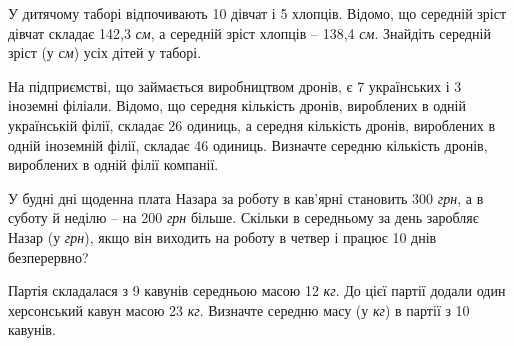 \documentclass[12pt]{article}
\begin{document}
\begin{samepage}
\noindent\zadnum У дитячому таборі відпочивають 10 дівчат і 5 хлопців. Відомо, що середній зріст дівчат складає 142{,}3 \textit{см}, а середній зріст хлопців – 138{,}4 \textit{см}. Знайдіть середній зріст (у \textit{см}) усіх дітей у таборі. 

\nmtnobreak
\nopagebreak\nbvspace{0.5cm}
\nmtAnswerBox
\par{}
\end{samepage}

\begin{samepage}
\noindent\zadnum На підприємстві, що займається виробництвом дронів, є 7 українських і 3 іноземні філіали. Відомо, що середня кількість дронів, вироблених в одній українській філії, складає 26 одиниць, а середня кількість дронів, вироблених в одній іноземній філії, складає 46 одиниць. Визначте середню кількість дронів, вироблених в одній філії компанії. 

\nmtnobreak
\nopagebreak\nbvspace{0.5cm}
\nmtAnswerBox
\par{}
\end{samepage}

\begin{samepage}
\noindent\zadnum У будні дні щоденна плата Назара за роботу в кав’ярні становить 300 \textit{грн}, а в суботу й неділю – на 200 \textit{грн} більше. Скільки в середньому за день заробляє Назар (у \textit{грн}), якщо він виходить на роботу в четвер і працює 10 днів безперервно? 

\nmtnobreak
\nopagebreak\nbvspace{0.5cm}
\nmtAnswerBox
\par{}
\end{samepage}

\begin{samepage}
\noindent\zadnum Партія складалася з 9 кавунів середньою масою 12 \textit{кг}. До цієї партії додали один херсонський кавун масою 23 \textit{кг}. Визначте середню масу (у \textit{кг}) в партії з 10 кавунів. 

\nmtnobreak
\nopagebreak\nbvspace{0.5cm}
\nmtAnswerBox
\par{}
\end{samepage}
\end{document}
